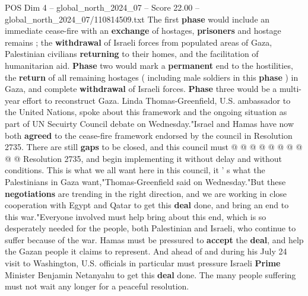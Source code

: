 \begin{textsample}{POS Dim 4 – global\_north\_2024\_07 – Score 22.00 – global\_north\_2024\_07/110814509.txt}
The first \textbf{phase} would include an immediate cease-fire with an \textbf{exchange} of hostages, \textbf{prisoners} and hostage remains ; the \textbf{withdrawal} of Israeli forces from populated areas of Gaza, Palestinian civilians \textbf{returning} to their homes, and the facilitation of humanitarian aid. \textbf{Phase} two would mark a \textbf{permanent} end to the hostilities, the \textbf{return} of all remaining hostages ( including male soldiers in this \textbf{phase} ) in Gaza, and complete \textbf{withdrawal} of Israeli forces. \textbf{Phase} three would be a multi-year effort to reconstruct Gaza.
Linda Thomas-Greenfield, U.S. ambassador to the United Nations, spoke about this framework and the ongoing situation as part of UN Secuirty Council debate on Wednesday."Israel and Hamas have now both \textbf{agreed} to the cease-fire framework endorsed by the council in Resolution 2735.
There are still \textbf{gaps} to be closed, and this council must @ @ @ @ @ @ @ @ @ @ Resolution 2735, and begin implementing it without delay and without conditions.
This is what we all want here in this council, it ' s what the Palestinians in Gaza want,"Thomas-Greenfield said on Wednesday."But these \textbf{negotiations} are trending in the right direction, and we are working in close cooperation with Egypt and Qatar to get this \textbf{deal} done, and bring an end to this war."Everyone involved must help bring about this end, which is so desperately needed for the people, both Palestinian and Israeli, who continue to suffer because of the war.
Hamas must be pressured to \textbf{accept} the \textbf{deal}, and help the Gazan people it claims to represent.
And ahead of and during his July 24 visit to Washington, U.S. officials in particular must pressure Israeli \textbf{Prime} Minister Benjamin Netanyahu to get this \textbf{deal} done.
The many people suffering must not wait any longer for a peaceful resolution.

\end{textsample}
